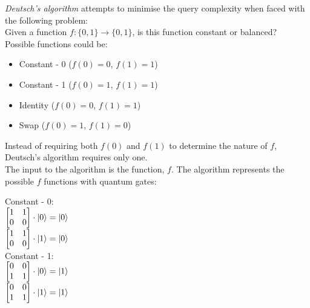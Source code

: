 \begin{definition}
    \emph{Deutsch's algorithm} attempts to minimise the query complexity when faced with the following problem:\\

    Given a function $f: \{0, 1\} \rightarrow \{0, 1\}$, is this function constant or balanced?\\
    
    Possible functions could be:
    \begin{itemize}
        \item Constant - 0 ($f(0)=0$, $f(1)=1$)
        \item Constant - 1 ($f(0)=1$, $f(1)=1$)
        \item Identity ($f(0)=0$, $f(1)=1$)
        \item Swap ($f(0)=1$, $f(1)=0$)
    \end{itemize}

    Instead of requiring both $f(0)$ and $f(1)$ to determine the nature of $f$, Deutsch's algorithm requires only one.\\
    The input to the algorithm is the function, $f$. The algorithm represents the possible $f$ functions with quantum gates:

    Constant - 0:\\
    $\begin{bmatrix}
        1 & 1\\
        0 & 0
    \end{bmatrix} \cdot \lvert0\rangle = \lvert0\rangle$\\

    $\begin{bmatrix}
        1 & 1\\
        0 & 0
    \end{bmatrix} \cdot \lvert1\rangle = \lvert0\rangle$\\


    Constant - 1:\\
    $\begin{bmatrix}
        0 & 0\\
        1 & 1
    \end{bmatrix} \cdot \lvert0\rangle = \lvert1\rangle$\\

    $\begin{bmatrix}
        0 & 0\\
        1 & 1
    \end{bmatrix} \cdot \lvert1\rangle = \lvert1\rangle$\\



\end{definition}
